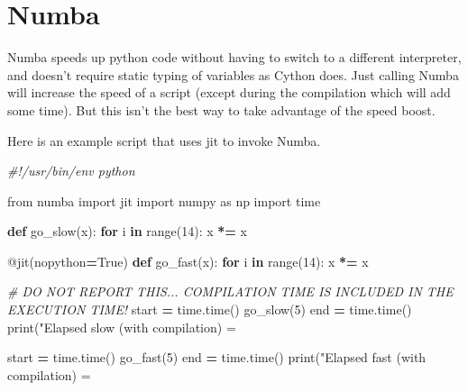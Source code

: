 \documentclass[]{book}
\newenvironment{Shaded}{\begin{snugshade}}{\end{snugshade}}
\newcommand{\KeywordTok}[1]{\textcolor[rgb]{0.13,0.29,0.53}{\textbf{#1}}}
\newcommand{\DecValTok}[1]{\textcolor[rgb]{0.00,0.00,0.81}{#1}}
\newcommand{\SpecialCharTok}[1]{\textcolor[rgb]{0.00,0.00,0.00}{#1}}
\newcommand{\StringTok}[1]{\textcolor[rgb]{0.31,0.60,0.02}{#1}}
\newcommand{\ImportTok}[1]{#1}
\newcommand{\CommentTok}[1]{\textcolor[rgb]{0.56,0.35,0.01}{\textit{#1}}}
\newcommand{\VariableTok}[1]{\textcolor[rgb]{0.00,0.00,0.00}{#1}}
\newcommand{\ControlFlowTok}[1]{\textcolor[rgb]{0.13,0.29,0.53}{\textbf{#1}}}
\newcommand{\OperatorTok}[1]{\textcolor[rgb]{0.81,0.36,0.00}{\textbf{#1}}}
\newcommand{\BuiltInTok}[1]{#1}
\newcommand{\AttributeTok}[1]{\textcolor[rgb]{0.77,0.63,0.00}{#1}}
\newcommand{\NormalTok}[1]{#1}
\begin{document}
\section{Numba}\label{numba}

Numba speeds up python code without having to switch to a different
interpreter, and doesn't require static typing of variables as Cython
does. Just calling Numba will increase the speed of a script (except
during the compilation which will add some time). But this isn't the
best way to take advantage of the speed boost.

Here is an example script that uses jit to invoke Numba.

\begin{Shaded}
\begin{Highlighting}[]
\CommentTok{#!/usr/bin/env python}

\ImportTok{from}\NormalTok{ numba }\ImportTok{import}\NormalTok{ jit}
\ImportTok{import}\NormalTok{ numpy }\ImportTok{as}\NormalTok{ np}
\ImportTok{import}\NormalTok{ time}

\KeywordTok{def}\NormalTok{ go_slow(x):}
    \ControlFlowTok{for}\NormalTok{ i }\KeywordTok{in} \BuiltInTok{range}\NormalTok{(}\DecValTok{14}\NormalTok{):}
\NormalTok{        x }\OperatorTok{*=}\NormalTok{ x}

\AttributeTok{@jit}\NormalTok{(nopython}\OperatorTok{=}\VariableTok{True}\NormalTok{)}
\KeywordTok{def}\NormalTok{ go_fast(x):}
    \ControlFlowTok{for}\NormalTok{ i }\KeywordTok{in} \BuiltInTok{range}\NormalTok{(}\DecValTok{14}\NormalTok{):}
\NormalTok{        x }\OperatorTok{*=}\NormalTok{ x}

\CommentTok{# DO NOT REPORT THIS... COMPILATION TIME IS INCLUDED IN THE EXECUTION TIME!}
\NormalTok{start }\OperatorTok{=}\NormalTok{ time.time()}
\NormalTok{go_slow(}\DecValTok{5}\NormalTok{)}
\NormalTok{end }\OperatorTok{=}\NormalTok{ time.time()}
\BuiltInTok{print}\NormalTok{(}\StringTok{"Elapsed slow (with compilation) = }\SpecialCharTok{%s}\StringTok{"} \OperatorTok{%}\NormalTok{ (end }\OperatorTok{-}\NormalTok{ start))}
\NormalTok{start }\OperatorTok{=}\NormalTok{ time.time()}
\NormalTok{go_fast(}\DecValTok{5}\NormalTok{)}
\NormalTok{end }\OperatorTok{=}\NormalTok{ time.time()}
\BuiltInTok{print}\NormalTok{(}\StringTok{"Elapsed fast (with compilation) = }\SpecialCharTok{%s}\StringTok{"} \OperatorTok{%}\NormalTok{ (end }\OperatorTok{-}\NormalTok{ start))}

}}
\end{Highlighting}
\end{Shaded}
\end{document}
